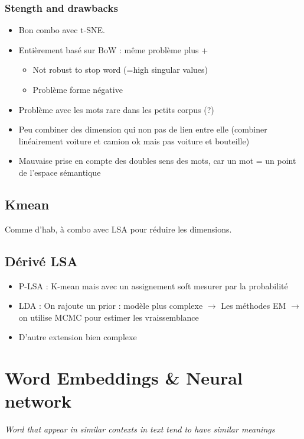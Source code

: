 \documentclass{article}
\theoremstyle{plain}%
\theoremstyle{definition}
\theoremstyle{remark}
\begin{document}
\subsubsection{Stength and drawbacks}
\begin{itemize}
    \item Bon combo avec t-SNE.
    \item Entièrement basé sur BoW : même problème  plus +\begin{itemize}
        \item Not robust to stop word (=high singular values)
        \item Problème forme négative 
    \end{itemize}
    \item Problème avec les mots rare dans les petits corpus (?)
    \item Peu combiner des dimension qui non pas de lien entre elle (combiner linéairement voiture et camion ok mais pas voiture et bouteille)
    \item Mauvaise prise en compte des doubles sens des mots, car un mot = un point de l'espace sémantique
\end{itemize}

\subsection{Kmean}
Comme d'hab, à combo avec LSA pour réduire les dimensions. 
\subsection{Dérivé LSA}
\begin{itemize}
    \item P-LSA : K-mean mais avec un assignement soft mesurer par la probabilité
    \item LDA : On rajoute un prior : modèle plus complexe $\rightarrow$ Les méthodes EM  $\rightarrow$ on utilise MCMC pour estimer les vraissemblance
    \item D'autre extension bien complexe
\end{itemize}





\section{Word Embeddings \& Neural network}
{\large \begin{center}
\textit{Word that appear in similar contexts in text tend to have similar meanings}
\end{center}}
\end{document}
